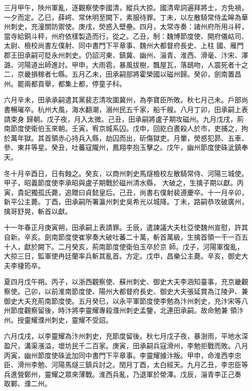\begin{pinyinscope}
 三月甲午，陜州軍亂，逐觀察使李國清，縱兵大掠。國清卑詞遍拜將士，方免禍，一夕而定。乙巳，薛崿、常休明至闕下，素服待罪。丁未，以左散騎常侍孟皞為華州刺史，充潼關防禦使。庚戌，熒惑入壁壘。四月，太常寺奏：諸州府所用斗秤，當寺給銅斗秤，州府依樣製造而行，從之。乙丑，制：魏博節度使、開府儀岵司、太尉、檢校尚書左僕射、同中書門下平章事、魏州大都督府長史、上柱
 國、雁門郡王田承嗣可貶永州刺史。仍詔河東、鎮冀、幽州、淄青、淮西、滑毫、汴宋、澤潞、河陽道出師進討。甲申，大雨雹，暴風拔樹，飄屋瓦，落鴟吻，人震死者十之二，京畿損稼者七縣。五月乙未，田承嗣部將霍榮國以磁州歸。癸卯，劍南置昌州。罷兩都貢舉，都集上都，停童子科。



 六月辛未，田承承嗣遣其黨裴志清攻圍冀州，為李寶臣所敗。秋七月己未。戶部尚書暢璀卒。杭州大風，海水翻潮，溺州民五千家，船千艘。八月丁卯，田承嗣上表請束身
 歸朝。戊子夜，月入太微。己丑，田承嗣將盧子期攻磁州。九月戊戌，荊南節度使衛伯玉來朝。壬寅，宥京城系囚。戊申，回紇白晝殺人於市，吏捕之，拘於萬年獄。其首領赤心持兵入縣，劫囚而出，斫傷獄吏。月暈，熒惑犯昴、五車、參、東井等星。癸丑，吐蕃寇隴州，鳳翔李抱玉擊之。戊午，幽州節度使硃泚鎮奉天。



 冬十月辛酉日，日有蝕之。癸亥，以商州刺史馬燧檢校左散騎常侍、河陽三城使。甲子，昭義節度使李承昭與盧子期戰於磁州清水縣，
 大破之，生擒子期以獻。丙寅，貴妃獨孤氏薨，追贈曰貞懿皇后。己丑，尚書右僕射裴遵慶卒。十一月辛卯，新平公主薨。丁酉，田承嗣所署瀛州刺史吳希光以城降。丁未，路嗣恭攻破廣州，擒哥舒晃，斬首以獻。



 十一年春正月庚寅朔，田承嗣上表請罪。壬辰，遣諫議大夫杜亞使魏州宣慰，許其自新。辛亥。劍南節度使崔寧奏大破吐蕃二十萬，斬首萬級，生擒首領一千一百五十人，獻於闕下。二月癸亥，荊南節度使衛伯玉卒於京
 師。戊子，河陽軍復亂，大掠三日，監軍使冉廷蘭率兵斬其亂首。方定。戊申，昌樂公主薨。辛亥，御史大夫李棲筠卒。



 夏四月戊午朔。丙子，以浙西觀察使、蘇州刺史、御史大夫李涵知臺事，充京畿觀察使。己卯，以前淮南節度使、陽州大都督府長史、御史大夫張延賞為江陵尹、兼御史大夫充荊南節度使。五月癸巳，以永平軍節度使李勉為汴州刺史，充汴宋等八州節度觀察留後，時汴將李靈耀專殺濮州刺史孟鑒，北連田承嗣。故命勉兼
 領汴州。授靈耀濮州刺史，靈耀不受詔。



 六月戊戌，以李靈耀為汴州刺史，充節度留後。秋七月戊子夜，暴澍雨，平地水深盈尺，溝渠漲溢，壞坊民千二百家。庚寅，田承嗣兵寇滑州，李勉拒戰而敗。八月丙寅，幽州節度使硃泚加同中書門下平章事。李靈耀據汴叛。甲申，命淮西李忠臣、滑州李勉、河陽馬燧三鎮兵討之。閏月丁酉，太白經天。九月乙丑，李忠臣等兵進營鄭州，靈耀之眾來薄戰。淮西兵亂，乃退軍於滎澤。戊辰，淄青李正己奏
 取鄆、濮二州。




\end{pinyinscope}
